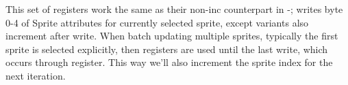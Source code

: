 \subsubsection{}

This set of registers work the same as their non-inc counterpart in -; writes byte 0-4 of Sprite attributes for currently selected sprite, except  variants also increment  after write. When batch updating multiple sprites, typically the first sprite is selected explicitly, then  registers are used until the last write, which occurs through  register. This way we'll also increment the sprite index for the next iteration.


\pagebreak